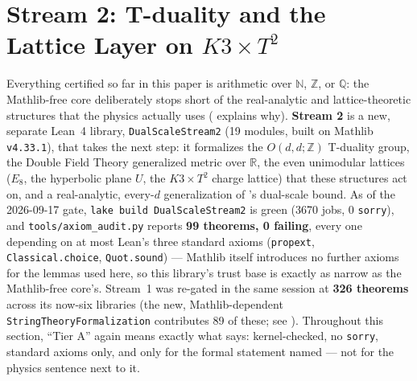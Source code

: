 \documentclass[11pt,a4paper]{article}
\theoremstyle{remark}
\begin{document}
\section{Stream 2: T-duality and the Lattice Layer on \texorpdfstring{$K3\times T^2$}{K3 x T2}}
\label{sec:stream2}

Everything certified so far in this paper is arithmetic over $\mathbb N$, $\mathbb Z$, or $\mathbb Q$:
the Mathlib-free core deliberately stops short of the real-analytic and lattice-theoretic structures
that the physics actually uses ( explains why). \textbf{Stream 2} is a new,
separate Lean~4 library, \texttt{DualScaleStream2} (19 modules, built on Mathlib \texttt{v4.33.1}),
that takes the next step: it formalizes the $O(d,d;\mathbb Z)$ T-duality group, the Double Field
Theory generalized metric over $\mathbb R$, the even unimodular lattices ($E_8$, the hyperbolic
plane $U$, the $K3\times T^2$ charge lattice) that these structures act on, and a real-analytic,
every-$d$ generalization of 's dual-scale bound. As of the 2026-09-17 gate,
\texttt{lake build DualScaleStream2} is green (3670 jobs, 0 \texttt{sorry}), and
\texttt{tools/axiom\_\discretionary{}{}{}audit.py} reports \textbf{99 theorems, 0 failing}, every one
depending on at most Lean's three standard axioms (\texttt{propext}, \texttt{Classical.choice},
\texttt{Quot.sound}) --- Mathlib itself introduces no further axioms for the lemmas used here, so
this library's trust base is exactly as narrow as the Mathlib-free core's. Stream~1 was re-gated in
the same session at \textbf{326 theorems} across its now-six libraries (the new,
Mathlib-dependent \texttt{StringTheoryFormalization} contributes 89 of these; see
). Throughout this section, ``Tier A'' again means exactly what
 says: kernel-checked, no \texttt{sorry}, standard axioms only, and only for the
formal statement named --- not for the physics sentence next to it.
\end{document}
